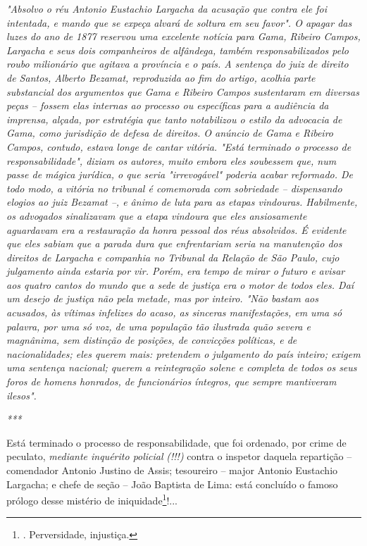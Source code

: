 \emph{"Absolvo o réu Antonio Eustachio Largacha da acusação que contra
ele foi intentada, e mando que se expeça alvará de soltura em seu
favor". O apagar das luzes do ano de 1877 reservou uma excelente notícia
para Gama, Ribeiro Campos, Largacha e seus dois companheiros de
alfândega, também responsabilizados pelo roubo milionário que agitava a
província e o país. A sentença do juiz de direito de Santos, Alberto
Bezamat, reproduzida ao fim do artigo, acolhia parte substancial dos
argumentos que Gama e Ribeiro Campos sustentaram em diversas peças --
fossem elas internas ao processo ou específicas para a audiência da
imprensa, alçada, por estratégia que tanto notabilizou o estilo da
advocacia de Gama, como jurisdição de defesa de direitos. O anúncio de
Gama e Ribeiro Campos, contudo, estava longe de cantar vitória. "Está
terminado o processo de responsabilidade", diziam os autores, muito
embora eles soubessem que, num passe de mágica jurídica, o que seria
"irrevogável" poderia acabar reformado. De todo modo, a vitória no
tribunal é comemorada com sobriedade -- dispensando elogios ao juiz
Bezamat --, e ânimo de luta para as etapas vindouras. Habilmente, os
advogados sinalizavam que a etapa vindoura que eles ansiosamente
aguardavam era a restauração da honra pessoal dos réus absolvidos. É
evidente que eles sabiam que a parada dura que enfrentariam seria na
manutenção dos direitos de Largacha e companhia no Tribunal da Relação
de São Paulo, cujo julgamento ainda estaria por vir. Porém, era tempo de
mirar o futuro e avisar aos quatro cantos do mundo que a sede de justiça
era o motor de todos eles. Daí um desejo de justiça não pela metade, mas
por inteiro. "Não bastam aos acusados, às vítimas infelizes do acaso, as
sinceras manifestações, em uma só palavra, por uma só voz, de uma
população tão ilustrada quão severa e magnânima, sem distinção de
posições, de convicções políticas, e de nacionalidades; eles querem
mais: pretendem o julgamento do país inteiro; exigem uma sentença
nacional; querem a reintegração solene e completa de todos os seus foros
de homens honrados, de funcionários íntegros, que sempre mantiveram
ilesos". }

\emph{***}

Está terminado o processo de responsabilidade, que foi ordenado, por
crime de peculato, \emph{mediante inquérito policial} \emph{(!!!)}
contra o inspetor daquela repartição -- comendador Antonio Justino de
Assis; tesoureiro -- major Antonio Eustachio Largacha; e chefe de seção
-- João Baptista de Lima: está concluído o famoso prólogo desse mistério
de iniquidade\footnote{. Perversidade, injustiça.}!...

